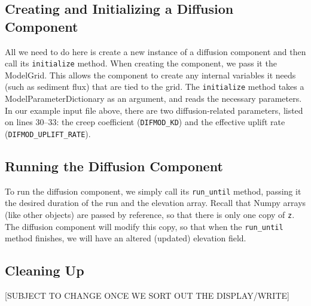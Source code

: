 \documentclass[12pt]{article}
\newcommand{\code}[1]{{\tt #1}}
\begin{document}
\subsection{Creating and Initializing a Diffusion Component}



All we need to do here is create a new instance of a diffusion component and then call its \code{initialize} method. When creating the component, we pass it the ModelGrid. This allows the component to create any internal variables it needs (such as sediment flux) that are tied to the grid. The \code{initialize} method takes a ModelParameterDictionary as an argument, and reads the necessary parameters. In our example input file above, there are two diffusion-related parameters, listed on lines 30--33: the creep coefficient (\code{DIFMOD\_KD}) and the effective uplift rate (\code{DIFMOD\_UPLIFT\_RATE}).

\subsection{Running the Diffusion Component}



To run the diffusion component, we simply call its \code{run\_until} method, passing it the desired duration of the run and the elevation array. Recall that Numpy arrays (like other objects) are passed by reference, so that there is only one copy of \code{z}. The diffusion component will modify this copy, so that when the \code{run\_until} method finishes, we will have an altered (updated) elevation field.

\subsection{Cleaning Up}



[SUBJECT TO CHANGE ONCE WE SORT OUT THE DISPLAY/WRITE]









\newpage


\end{document}
